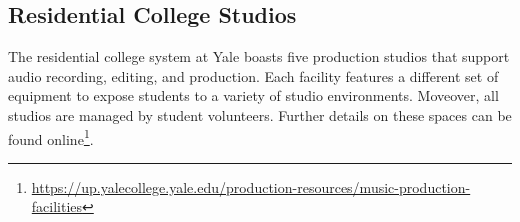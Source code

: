 \subsection{Residential College Studios}

The residential college system at Yale boasts five production studios that support audio recording, editing, and production. Each facility features a different set of equipment to expose students to a variety of studio environments. Moveover, all studios are managed by student volunteers. Further details on these spaces can be found online\footnote{\url{https://up.yalecollege.yale.edu/production-resources/music-production-facilities}}.

